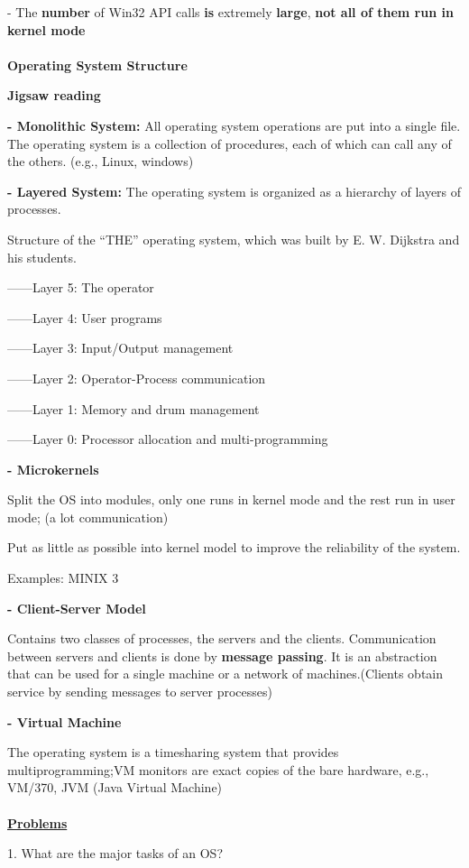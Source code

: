 \documentclass[]{report}
\begin{document}
- The \textbf{number} of Win32 API calls \textbf{is} extremely \textbf{large}, \textbf{not all of them run in kernel mode}\\\\
\textbf{Operating System Structure}

\textbf{Jigsaw reading}

\textbf{- Monolithic System: }All operating system operations are put into a single
file. The operating system is a collection of
procedures, each of which can call any of the others.
(e.g., Linux, windows)

\textbf{- Layered System: }
The operating system is organized as a hierarchy
of layers of processes.

Structure of the “THE” operating system,
which was built by E. W. Dijkstra and his students.

------Layer 5: The operator

------Layer 4: User programs

------Layer 3: Input/Output management

------Layer 2: Operator-Process communication

------Layer 1: Memory and drum management

------Layer 0: Processor allocation and multi-programming

\textbf{- Microkernels}

Split the OS into modules, only one runs in kernel mode
and the rest run in user mode; (a lot communication)

Put as little as possible into kernel model to improve the
reliability of the system.

Examples: MINIX 3

\textbf{- Client-Server Model}

Contains two classes of processes, the servers and
the clients. Communication between servers and
clients is done by \textbf{message passing}. It is an
abstraction that can be used for a single machine or
a network of machines.(Clients obtain service by sending messages to server processes)

\textbf{- Virtual Machine}

The operating system is a timesharing system that
provides multiprogramming;VM monitors are
exact copies of the bare hardware, e.g., VM/370, JVM
(Java Virtual Machine)\\\\
\underline{\textbf{Problems}}

1. What are the major tasks of an OS?
\end{document}
